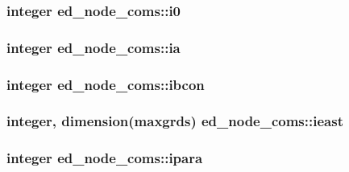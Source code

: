 \subsubsection[{\texorpdfstring{i0}{i0}}]{\setlength{\rightskip}{0pt plus 5cm}integer ed\+\_\+node\+\_\+coms\+::i0}\hypertarget{namespaceed__node__coms_a6326a182f11b478fe044adfb8a29573f}{}\label{namespaceed__node__coms_a6326a182f11b478fe044adfb8a29573f}
\subsubsection[{\texorpdfstring{ia}{ia}}]{\setlength{\rightskip}{0pt plus 5cm}integer ed\+\_\+node\+\_\+coms\+::ia}\hypertarget{namespaceed__node__coms_a78402c54439b56822a5a8e6812a3ad90}{}\label{namespaceed__node__coms_a78402c54439b56822a5a8e6812a3ad90}
\subsubsection[{\texorpdfstring{ibcon}{ibcon}}]{\setlength{\rightskip}{0pt plus 5cm}integer ed\+\_\+node\+\_\+coms\+::ibcon}\hypertarget{namespaceed__node__coms_a15c70a911fbe3be8baecfaa2c78e5340}{}\label{namespaceed__node__coms_a15c70a911fbe3be8baecfaa2c78e5340}
\subsubsection[{\texorpdfstring{ieast}{ieast}}]{\setlength{\rightskip}{0pt plus 5cm}integer, dimension(maxgrds) ed\+\_\+node\+\_\+coms\+::ieast}\hypertarget{namespaceed__node__coms_a6aa981e6ec7f7d2b2aea7f3b372fadc9}{}\label{namespaceed__node__coms_a6aa981e6ec7f7d2b2aea7f3b372fadc9}
\subsubsection[{\texorpdfstring{ipara}{ipara}}]{\setlength{\rightskip}{0pt plus 5cm}integer ed\+\_\+node\+\_\+coms\+::ipara}\hypertarget{namespaceed__node__coms_a6b574c65e348d02c2d74df596965828a}{}\label{namespaceed__node__coms_a6b574c65e348d02c2d74df596965828a}
